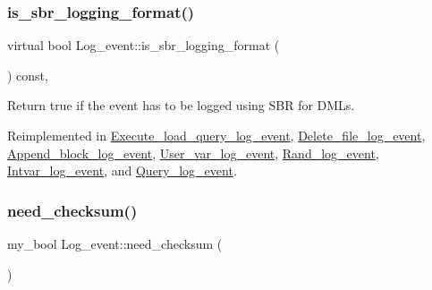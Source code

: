 \mbox{\label{classLog__event_ad4d689d007b7c8f1b0d54e65d8f34069}} 
\subsubsection{\texorpdfstring{is\+\_\+sbr\+\_\+logging\+\_\+format()}{is\_sbr\_logging\_format()}}
{\footnotesize\ttfamily virtual bool Log\+\_\+event\+::is\+\_\+sbr\+\_\+logging\+\_\+format (\begin{DoxyParamCaption}{ }\end{DoxyParamCaption}) const\hspace{0.3cm}{\ttfamily [inline]}, {\ttfamily [virtual]}}

Return true if the event has to be logged using S\+BR for D\+M\+Ls. 

Reimplemented in \mbox{\hyperlink{classExecute__load__query__log__event_a8980ecbe8b7f0431a201498aa245c88d}{Execute\+\_\+load\+\_\+query\+\_\+log\+\_\+event}}, \mbox{\hyperlink{classDelete__file__log__event_a3cba2bd9057ac18a7ac720bbfeb2081f}{Delete\+\_\+file\+\_\+log\+\_\+event}}, \mbox{\hyperlink{classAppend__block__log__event_a6f758b2da7126c0a881bcc901f481472}{Append\+\_\+block\+\_\+log\+\_\+event}}, \mbox{\hyperlink{classUser__var__log__event_a324c3239a7fefb0ad5c0ae44984d1683}{User\+\_\+var\+\_\+log\+\_\+event}}, \mbox{\hyperlink{classRand__log__event_a3b5f698453eb2deee160e5ab771e94b2}{Rand\+\_\+log\+\_\+event}}, \mbox{\hyperlink{classIntvar__log__event_adb0ffc05f019430b9d33c4742f92819f}{Intvar\+\_\+log\+\_\+event}}, and \mbox{\hyperlink{classQuery__log__event_a2a3e67710fa962765847ed1df1552864}{Query\+\_\+log\+\_\+event}}.

\mbox{\label{classLog__event_aacff30f48b3ce70749cd22cb6576cd52}} 
\subsubsection{\texorpdfstring{need\+\_\+checksum()}{need\_checksum()}}
{\footnotesize\ttfamily my\+\_\+bool Log\+\_\+event\+::need\+\_\+checksum (\begin{DoxyParamCaption}{ }\end{DoxyParamCaption})\hspace{0.3cm}{\ttfamily [protected]}}

